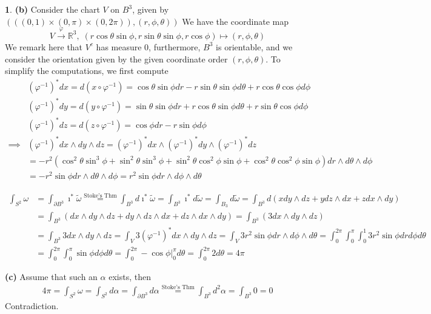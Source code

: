 \documentclass[10.5pt]{article}
\theoremstyle{definition}
\newtheorem{pb}{}
\newcommand{\z}{\imath}
\begin{document}
\begin{pb}
        \textbf{(b)} Consider the chart \(V\) on \(B^3\), given by \((\left((0,1)\times(0,\pi)\times(0,2\pi)\right),(r,\phi,\theta))\) We have the coordinate map \[ V \overset{\varphi}{\to} \mathbb{R}^3, \;(r\cos\theta\sin\phi,r\sin\theta\sin\phi,r\cos\phi) \mapsto (r,\phi,\theta)\] We remark here that \(V^c\) has measure \(0\), furthermore, \(B^3\) is orientable, and we consider the orientation given by the given coordinate order \((r,\phi,\theta)\).
        To simplify the computations, we first compute
        \begin{align*}
            &(\varphi^{-1})^*dx = d(x\circ\varphi^{-1}) = \cos\theta\sin\phi dr - r\sin\theta\sin\phi d\theta + r\cos\theta\cos\phi d\phi\\
            &(\varphi^{-1})^*dy = d(y\circ \varphi^{-1}) = \sin\theta\sin\phi dr + r\cos\theta\sin\phi d\theta + r\sin\theta \cos\phi d\phi\\
            &(\varphi^{-1})^*dz = d(z \circ \varphi^{-1}) = \cos\phi dr - r\sin\phi d\phi\\
            \implies &(\varphi^{-1})^* dx \wedge dy \wedge dz = (\varphi^{-1})^*dx \wedge (\varphi^{-1})^*dy \wedge (\varphi^{-1})^*dz\\
            &= 
            -r^2(\cos^2\theta \sin^3\phi + \sin^2\theta\sin^3\phi + \sin^2\theta\cos^2\phi\sin\phi + \cos^2\theta\cos^2\phi\sin\phi) dr \wedge d\theta \wedge d\phi \\
            &=
            -r^2\sin\phi dr \wedge d\theta \wedge d\phi = r^2 \sin\phi dr\wedge d\phi \wedge d\theta
        \end{align*}

        \begin{align*}
            \int_{S^2} \omega &= \int_{\partial B^3} \z^* \tilde{\omega} \overset{\text{Stoke's Thm}}{=} \int_{B^3} d\z^*{\tilde{\omega}} =  \int_{B^3} \z^* d \tilde{\omega} = \int_{B_3} d\tilde{\omega} = \int_{B^3} d(x dy \wedge dz + y dz \wedge dx + z dx \wedge dy) \\
            &= \int_{B^3} (dx \wedge dy \wedge dz + dy \wedge dz \wedge dx + dz \wedge dx \wedge dy) = \int_{B^3} (3dx \wedge dy \wedge dz) \\
            &= \int_{B^3} 3 dx \wedge dy \wedge dz = \int_V 3(\varphi^{-1})^*dx\wedge dy \wedge dz
            = \int_{V} 3r^2\sin\phi dr \wedge d\phi \wedge d\theta = \int_0^{2\pi}\int_0^{\pi}\int_0^1 3r^2\sin\phi dr d\phi d\theta \\
            &= \int_0^{2\pi}\int_0^{\pi}\sin\phi d\phi d\theta = \int_0^{2\pi} -\cos\phi\vert_0^\pi d\theta
            = \int_0^{2\pi}2d\theta = 4\pi
        \end{align*}

        \textbf{(c)} Assume that such an \(\alpha\) exists, then
        \begin{align*}
            4\pi = \int_{S^2} \omega = \int_{S^2}d \alpha = \int_{\partial B^3}d \alpha \overset{\text{Stoke's Thm}}{=} \int_{B^3} d^2 \alpha = \int_{B^3} 0 = 0
        \end{align*}
        Contradiction.
    \end{pb}
\end{document}
